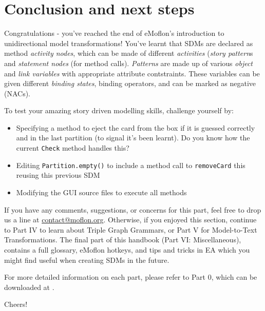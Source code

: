 \genHeader
\section{Conclusion and next steps}

\vspace{0.5cm}

Congratulations - you've reached the end of eMoflon's introduction to unidirectional model transformations! You've learnt that SDMs are declared as method
\emph{activity nodes}, which can be made of different \emph{activities} (\emph{story pattern}s and \emph{statement nodes} (for method calls). \emph{Patterns}
are made up of various \emph{object} and \emph{link variables} with appropriate attribute contstraints. These variables can be given different \emph{binding
states}, binding operators, and can be marked as negative (NACs).

\vspace{0.5cm}

To test your amazing story driven modelling skills, challenge yourself by:
\begin{itemize}
\item Specifying a method to eject the card from the box if it is guessed correctly and in the last partition (to signal it's been learnt). Do you know how the
current \texttt{Check} method handles this?
\item Editing \texttt{Partition.empty()} to include a method call to \texttt{removeCard} this reusing this previous SDM
\item Modifying the GUI source files to execute all methods
\end{itemize}

\vspace{0.5cm}
	
If you have any comments, suggestions, or concerns for this part, feel free to drop us a line at \href{mailto:contact@moflon.org}{contact@moflon.org}.
Otherwise, if you enjoyed this section, continue to Part IV to learn about Triple Graph Grammars, or Part V for Model-to-Text Transformations.
The final part of this handbook (Part VI: Miscellaneous), contains a full glossary, eMoflon hotkeys, and tips and tricks in EA which you might find
useful when creating SDMs in the future.

For more detailed information on each part, please refer to Part 0, which can be downloaded at \dlPartZero.
\vspace{0.5cm}

Cheers!
